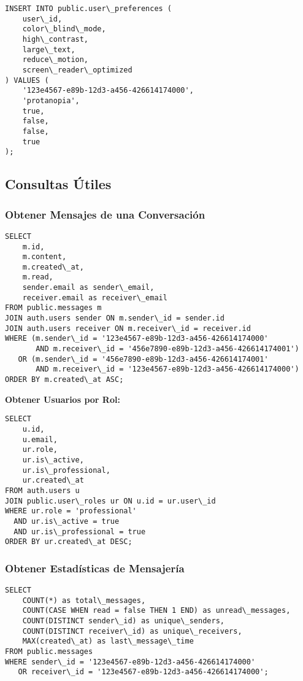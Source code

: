 \documentclass[12pt,a4paper]{article}
\begin{document}
\begin{lstlisting}[caption=Ejemplo de configuración de accesibilidad]
INSERT INTO public.user\_preferences (
    user\_id,
    color\_blind\_mode,
    high\_contrast,
    large\_text,
    reduce\_motion,
    screen\_reader\_optimized
) VALUES (
    '123e4567-e89b-12d3-a456-426614174000',
    'protanopia',
    true,
    false,
    false,
    true
);
\end{lstlisting}

\subsection{Consultas Útiles}

\subsubsection{Obtener Mensajes de una Conversación}

\begin{lstlisting}[caption=Consulta de mensajes de conversación]
SELECT 
    m.id,
    m.content,
    m.created\_at,
    m.read,
    sender.email as sender\_email,
    receiver.email as receiver\_email
FROM public.messages m
JOIN auth.users sender ON m.sender\_id = sender.id
JOIN auth.users receiver ON m.receiver\_id = receiver.id
WHERE (m.sender\_id = '123e4567-e89b-12d3-a456-426614174000' 
       AND m.receiver\_id = '456e7890-e89b-12d3-a456-426614174001')
   OR (m.sender\_id = '456e7890-e89b-12d3-a456-426614174001' 
       AND m.receiver\_id = '123e4567-e89b-12d3-a456-426614174000')
ORDER BY m.created\_at ASC;
\end{lstlisting}

\textbf{Obtener Usuarios por Rol:}

\begin{lstlisting}[caption=Consulta de usuarios por rol]
SELECT 
    u.id,
    u.email,
    ur.role,
    ur.is\_active,
    ur.is\_professional,
    ur.created\_at
FROM auth.users u
JOIN public.user\_roles ur ON u.id = ur.user\_id
WHERE ur.role = 'professional'
  AND ur.is\_active = true
  AND ur.is\_professional = true
ORDER BY ur.created\_at DESC;
\end{lstlisting}

\subsubsection{Obtener Estadísticas de Mensajería}

\begin{lstlisting}[caption=Consulta de estadísticas de mensajería]
SELECT 
    COUNT(*) as total\_messages,
    COUNT(CASE WHEN read = false THEN 1 END) as unread\_messages,
    COUNT(DISTINCT sender\_id) as unique\_senders,
    COUNT(DISTINCT receiver\_id) as unique\_receivers,
    MAX(created\_at) as last\_message\_time
FROM public.messages
WHERE sender\_id = '123e4567-e89b-12d3-a456-426614174000' 
   OR receiver\_id = '123e4567-e89b-12d3-a456-426614174000';
\end{lstlisting}
\end{document}
